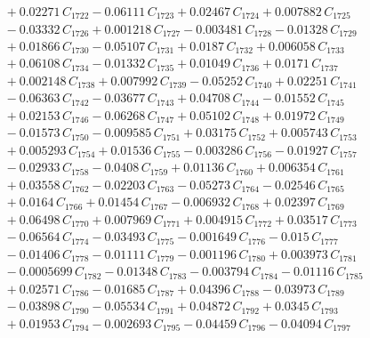 \documentclass[a4paper,11pt]{article}
\begin{document}
\begin{align}
&\quad + 0.02271\,C_{1722} - 0.06111\,C_{1723} + 0.02467\,C_{1724} + 0.007882\,C_{1725} \nonumber\\
&\quad - 0.03332\,C_{1726} + 0.001218\,C_{1727} - 0.003481\,C_{1728} - 0.01328\,C_{1729} \nonumber\\
&\quad + 0.01866\,C_{1730} - 0.05107\,C_{1731} + 0.0187\,C_{1732} + 0.006058\,C_{1733} \nonumber\\
&\quad + 0.06108\,C_{1734} - 0.01332\,C_{1735} + 0.01049\,C_{1736} + 0.0171\,C_{1737} \nonumber\\
&\quad + 0.002148\,C_{1738} + 0.007992\,C_{1739} - 0.05252\,C_{1740} + 0.02251\,C_{1741} \nonumber\\
&\quad - 0.06363\,C_{1742} - 0.03677\,C_{1743} + 0.04708\,C_{1744} - 0.01552\,C_{1745} \nonumber\\
&\quad + 0.02153\,C_{1746} - 0.06268\,C_{1747} + 0.05102\,C_{1748} + 0.01972\,C_{1749} \nonumber\\
&\quad - 0.01573\,C_{1750} - 0.009585\,C_{1751} + 0.03175\,C_{1752} + 0.005743\,C_{1753} \nonumber\\
&\quad + 0.005293\,C_{1754} + 0.01536\,C_{1755} - 0.003286\,C_{1756} - 0.01927\,C_{1757} \nonumber\\
&\quad - 0.02933\,C_{1758} - 0.0408\,C_{1759} + 0.01136\,C_{1760} + 0.006354\,C_{1761} \nonumber\\
&\quad + 0.03558\,C_{1762} - 0.02203\,C_{1763} - 0.05273\,C_{1764} - 0.02546\,C_{1765} \nonumber\\
&\quad + 0.0164\,C_{1766} + 0.01454\,C_{1767} - 0.006932\,C_{1768} + 0.02397\,C_{1769} \nonumber\\
&\quad + 0.06498\,C_{1770} + 0.007969\,C_{1771} + 0.004915\,C_{1772} + 0.03517\,C_{1773} \nonumber\\
&\quad - 0.06564\,C_{1774} - 0.03493\,C_{1775} - 0.001649\,C_{1776} - 0.015\,C_{1777} \nonumber\\
&\quad - 0.01406\,C_{1778} - 0.01111\,C_{1779} - 0.001196\,C_{1780} + 0.003973\,C_{1781} \nonumber\\
&\quad - 0.0005699\,C_{1782} - 0.01348\,C_{1783} - 0.003794\,C_{1784} - 0.01116\,C_{1785} \nonumber\\
&\quad + 0.02571\,C_{1786} - 0.01685\,C_{1787} + 0.04396\,C_{1788} - 0.03973\,C_{1789} \nonumber\\
&\quad - 0.03898\,C_{1790} - 0.05534\,C_{1791} + 0.04872\,C_{1792} + 0.0345\,C_{1793} \nonumber\\
&\quad + 0.01953\,C_{1794} - 0.002693\,C_{1795} - 0.04459\,C_{1796} - 0.04094\,C_{1797} \nonumber\\

\end{align}
\end{document}
